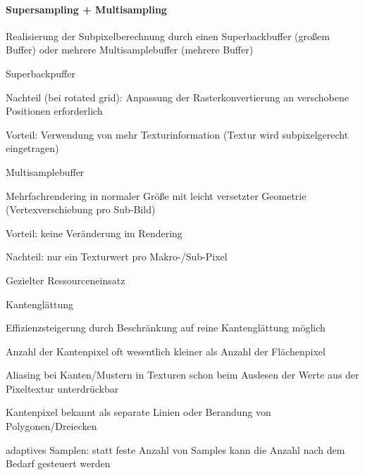 \documentclass[landscape]{article}
\begin{document}
\begin{multicols}{3}
  \paragraph{Supersampling + Multisampling}
  \begin{itemize*}
    \item Realisierung der Subpixelberechnung durch einen Superbackbuffer (großem Buffer) oder mehrere Multisamplebuffer (mehrere Buffer)
    \item Superbackpuffer
          \begin{itemize*}
            \item Nachteil (bei rotated grid): Anpassung der Rasterkonvertierung an verschobene Positionen erforderlich
            \item Vorteil: Verwendung von mehr Texturinformation (Textur wird subpixelgerecht eingetragen)
          \end{itemize*}
    \item Multisamplebuffer
          \begin{itemize*}
            \item Mehrfachrendering in normaler Größe mit leicht versetzter Geometrie (Vertexverschiebung pro Sub-Bild)
            \item Vorteil: keine Veränderung im Rendering
            \item Nachteil: nur ein Texturwert pro Makro-/Sub-Pixel
          \end{itemize*}
    \item Gezielter Ressourceneinsatz
          \begin{itemize*} 
            \item Kantenglättung
                  \begin{itemize*} 
                    \item Effizienzsteigerung durch Beschränkung auf reine Kantenglättung möglich
                    \item Anzahl der Kantenpixel oft wesentlich kleiner als Anzahl der Flächenpixel
                    \item Aliasing bei Kanten/Mustern in Texturen schon beim Auslesen der Werte aus der Pixeltextur unterdrückbar
                    \item Kantenpixel bekannt als separate Linien oder Berandung von Polygonen/Dreiecken
                  \end{itemize*}
            \item adaptives Samplen: statt feste Anzahl von Samples kann die Anzahl nach dem Bedarf gesteuert werden
          \end{itemize*}
  \end{itemize*}
  

\end{multicols}
\end{document}
